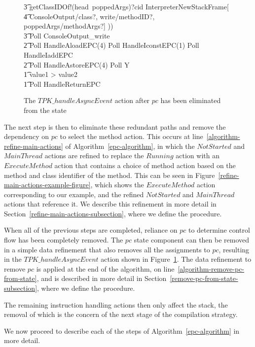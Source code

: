 \begin{figure}
\begin{circus}
    \t3 getClassIDOf!(head~poppedArgs)?cid \then \lschexpract InterpreterNewStackFrame[ \\
    \t4 ConsoleOutput/class?, write/methodID?, poppedArgs/methodArgs?] \rschexpract)) \circseq \\
    \t3 Poll \circseq ConsoleOutput\_write \\
    \t2 \circfi \circseq Poll \circseq HandleAloadEPC(4) \circseq Poll \circseq HandleIconstEPC(1) \circseq Poll \circseq HandleIaddEPC \circseq \\
    \t2 Poll \circseq HandleAstoreEPC(4) \circseq Poll \circseq Y \\
    \t1 {} \circelse value1 > value2 \circthen \Skip \\
    \t1 \circfi \circseq Poll \circseq HandleReturnEPC
  \end{circus}
  \caption{The $TPK\_handleAsyncEvent$ action after $pc$ has been eliminated from the state}
  \label{pc-elimination-HandleAsyncEvent-example-figure}
\end{figure}

The next step is then to eliminate these redundant paths and remove
the dependency on $pc$ to select the method action.
This occurs at line~\ref{algorithm-refine-main-actions} of
Algorithm~\ref{epc-algorithm}, in which the $NotStarted$ and
$MainThread$ actions are refined to replace the $Running$ action with
an $ExecuteMethod$ action that contains a choice of method action
based on the method and class identifier of the method.
This can be seen in Figure~\ref{refine-main-actions-example-figure},
which shows the $ExecuteMethod$ action corresponding to our example,
and the refined $NotStarted$ and $MainThread$ actions that reference
it.
We describe this refinement in more detail in
Section~\ref{refine-main-actions-subsection}, where we define the
 procedure.

When all of the previous steps are completed, reliance on $pc$ to
determine control flow has been completely removed.
The $pc$ state component can then be removed in a simple data
refinement that also removes all the assignments to $pc$, resulting in
the $TPK\_handleAsyncEvent$ action shown in
Figure~\ref{pc-elimination-HandleAsyncEvent-example-figure}.
The data refinement to remove $pc$ is applied at the end of the
algorithm, on line~\ref{algorithm-remove-pc-from-state}, and is
described in more detail in
Section~\ref{remove-pc-from-state-subsection}, where we define the
 procedure.

The remaining instruction handling actions then only affect the stack,
the removal of which is the concern of the next stage of the
compilation strategy.

We now proceed to describe each of the steps of
Algorithm~\ref{epc-algorithm} in more detail.